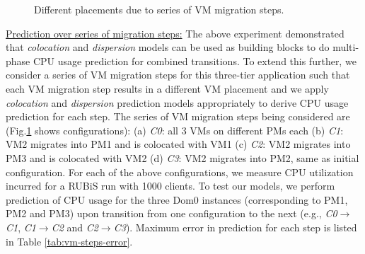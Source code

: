 \begin{figure}
	\caption{Different placements due to series of VM migration steps.}
	\label{fig:migration-steps}
\end{figure}



\underline{Prediction over series of migration steps:}
The above experiment demonstrated that \textit{colocation} and
\textit{dispersion} models can be used as building blocks to do multi-phase
CPU usage prediction for combined transitions. To extend this
further, we consider a series of VM migration steps for this three-tier
application such that each VM migration step results in a different
VM placement and we apply \emph{colocation} and
\emph{dispersion} prediction models
appropriately to derive CPU usage prediction for each step. The series
of VM migration steps being considered are (Fig.\ref{fig:migration-steps}
shows configurations): (a) \textit{C0}: all 3 VMs on different PMs each
(b) \textit{C1}: VM2 migrates into PM1 and is colocated with VM1
(c) \textit{C2}: VM2 migrates into PM3 and is colocated with VM2
(d) \textit{C3}: VM2 migrates into PM2, same as initial configuration.
For each of the above configurations, we measure CPU utilization
incurred for a RUBiS run with 1000 clients. To test our models, we perform
prediction of CPU usage for the three Dom0 instances (corresponding to
PM1, PM2 and PM3) upon transition from one configuration to the next (e.g.,
\textit{C0}$\rightarrow$\textit{C1},
\textit{C1}$\rightarrow$\textit{C2} and
\textit{C2}$\rightarrow$\textit{C3}).
Maximum error in prediction for each step is listed in
Table \ref{tab:vm-steps-error}.

